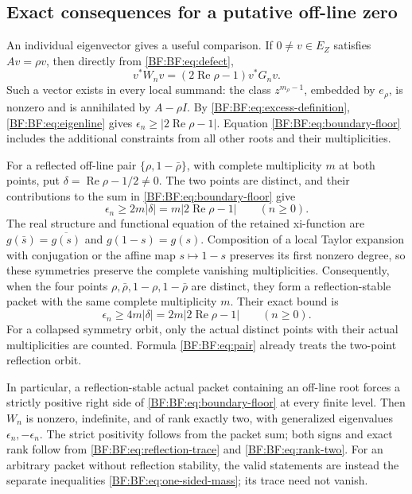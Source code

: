 \subsection{Exact consequences for a putative off-line zero}
\label{BF:BF:counterfactual}

An individual eigenvector gives a useful comparison.
If \(0\ne v\in E_Z\) satisfies \(Av=\rho v\), then directly from
\eqref{BF:BF:eq:defect},
\begin{equation}
v^*W_nv=(2\operatorname{Re}\rho-1)v^*G_nv.
\tag{BF.37}\label{BF:BF:eq:eigenline}
\end{equation}
Such a vector exists in every local summand: the class
\(z^{m_\rho-1}\), embedded by \(e_\rho\), is nonzero and is
annihilated by \(A-\rho I\).  By
\eqref{BF:BF:eq:excess-definition}, \eqref{BF:BF:eq:eigenline} gives
\(\epsilon_n\ge|2\operatorname{Re}\rho-1|\).
Equation \eqref{BF:BF:eq:boundary-floor} includes the additional
constraints from all other roots and their multiplicities.

For a reflected off-line pair
\(\{\rho,1-\bar\rho\}\), with complete multiplicity \(m\) at both
points, put \(\delta=\operatorname{Re}\rho-1/2\ne0\).
The two points are distinct, and their contributions to the sum
in \eqref{BF:BF:eq:boundary-floor} give
\begin{equation}
\epsilon_n\ge2m|\delta|
 =m|2\operatorname{Re}\rho-1|
 \qquad(n\ge0).
\tag{BF.38}\label{BF:BF:eq:pair}
\end{equation}
The real structure and functional equation of the retained
xi-function are \(g(\bar s)=\overline{g(s)}\) and \(g(1-s)=g(s)\).
Composition of a local Taylor expansion with conjugation or the
affine map \(s\mapsto1-s\) preserves its first nonzero degree, so
these symmetries preserve the complete vanishing multiplicities.
Consequently, when the four points
\(\rho,\bar\rho,1-\rho,1-\bar\rho\) are distinct, they form a
reflection-stable packet with the same complete multiplicity \(m\).
Their exact bound is
\begin{equation}
\epsilon_n\ge4m|\delta|
 =2m|2\operatorname{Re}\rho-1|
 \qquad(n\ge0).
\tag{BF.39}\label{BF:BF:eq:quartet}
\end{equation}
For a collapsed symmetry orbit, only the actual distinct points
with their actual multiplicities are counted.  Formula
\eqref{BF:BF:eq:pair} already treats the two-point reflection orbit.

In particular, a reflection-stable actual packet containing an
off-line root forces a strictly positive right side of
\eqref{BF:BF:eq:boundary-floor} at every finite level.
Then \(W_n\) is nonzero, indefinite, and of rank exactly two,
with generalized eigenvalues \(\epsilon_n,-\epsilon_n\).
The strict positivity follows from the packet sum; both signs
and exact rank follow from \eqref{BF:BF:eq:reflection-trace}
and \eqref{BF:BF:eq:rank-two}.  For an arbitrary packet without
reflection stability, the valid statements are instead the
separate inequalities \eqref{BF:BF:eq:one-sided-mass}; its trace
need not vanish.

